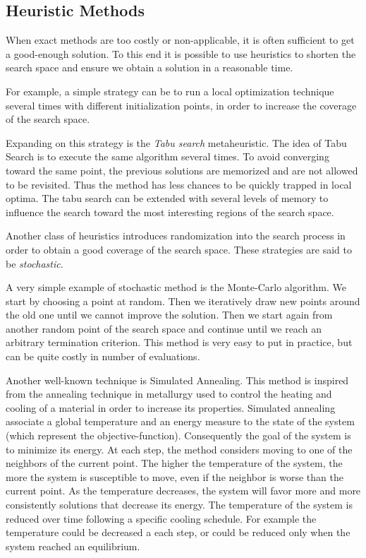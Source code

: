 \subsection{Heuristic Methods}\label{optim_heuristic}

When exact methods are too costly or non-applicable, it is often sufficient to get a good-enough solution. To this end it is possible to use heuristics to shorten the search space and ensure we obtain a solution in a reasonable time.

For example, a simple strategy can be to run a local optimization technique several times with different initialization points, in order to increase the coverage of the search space.

Expanding on this strategy is the \emph{Tabu search} metaheuristic. The idea of Tabu Search is to execute the same algorithm several times. To avoid converging  toward the same point, the previous solutions are memorized and are not allowed to be revisited. Thus the method has less chances to be quickly trapped in local optima.
The tabu search can be extended with several levels of memory to influence the search toward the most interesting regions of the search space.

Another class of heuristics introduces randomization into the search process in order to obtain a good coverage of the search space. These strategies are said to be \emph{stochastic}.

A very simple example of stochastic method is the Monte-Carlo algorithm. We start by choosing a point at random. Then we iteratively draw new points around the old one until we cannot improve the solution. Then we start again from another random point of the search space and continue until we reach an arbitrary termination criterion.
This method is very easy to put in practice, but can be quite costly in number of evaluations.

Another well-known technique is Simulated Annealing. This method is inspired from the annealing technique in metallurgy used to control the heating and cooling of a material in order to increase its properties.
Simulated annealing associate a global temperature and an energy measure to the state of the system (which represent the objective-function). Consequently the goal of the system is to minimize its energy. At each step, the method considers moving to one of the neighbors of the current point. The higher the temperature of the system, the more the system is susceptible to move, even if the neighbor is worse than the current point. As the temperature decreases, the system will favor more and more consistently solutions that decrease its energy.
The temperature of the system is reduced over time following a specific cooling schedule. For example the temperature could be decreased a each step, or could be reduced only when the system reached an equilibrium.

